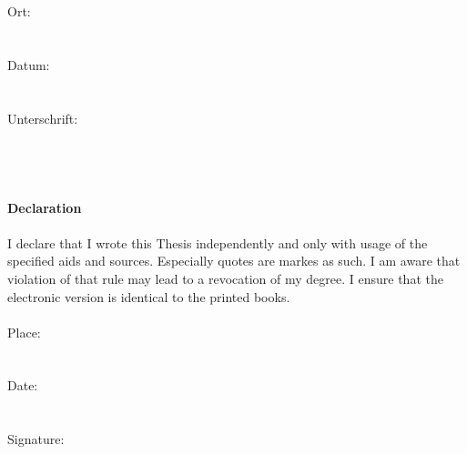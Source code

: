 \documentclass[a4paper,12pt]{report}
\begin{document}
Ort:\\\\\\

Datum:\\\\\\

Unterschrift:\\\\\\\\\\

{\fontsize{20}{23}\selectfont\textbf{Declaration}}\\\\


I declare that I wrote this Thesis independently and only with usage of the specified aids and sources. Especially quotes are markes as such. I am aware that violation of that rule may lead to a revocation of my degree. I ensure that the electronic version is identical to the printed books.\\\\

Place:\\\\\\

Date:\\\\\\

Signature:
\vspace*{\fill}         %
\end{document}
